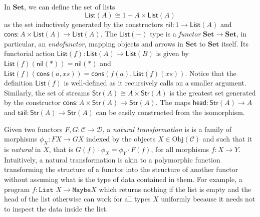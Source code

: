 \documentclass[a4paper,UKenglish,cleveref, autoref, thm-restate]{lipics-v2021}
\newcommand{\operator}[1]{\textsf{#1}}
\newcommand{\head}{\operator{head}}
\newcommand{\tail}{\operator{tail}}
\newcommand{\CatC}{\mathcal{C}}
\newcommand{\CatD}{\mathcal{D}}
\newcommand{\Set}{\mathbf{Set}}
\newcommand{\iso}{\cong}
\newcommand{\Obj}{\text{Obj}}
\newcommand{\Str}[1]{\operator{Str}(#1)}
\newcommand{\List}[1]{\operator{List}(#1)}
\newcommand{\nil}{\operator{nil}}
\newcommand{\cons}{\operator{cons}}
\begin{document}
In $\Set$, we can define the set of lists
\[
  \List{A} \iso 1 + A \times \List{A}
\]
as the set inductively generated by the constructors $\nil : 1 \to \List{A}$ and
$\cons : A \times \List{A} \to \List{A}$. The $\List{-}$ type is a
\emph{functor} $\Set \to \Set$, in particular, an \emph{endofunctor}, mapping
objects and arrows in $\Set$ to $\Set$ itself.
Its functorial action $\List{f} : \List{A} \to \List{B}$ is given by
$\List{f}(\nil(*)) = \nil(*)$ and
$\List{f}(\cons(a,xs)) = \cons(f(a), \List{f}(xs))$. Notice that the definition
$\List{f}$ is well-defined as it recursively calls on a smaller argument.
Similarly, the set of streams $\Str{A} \iso A \times \Str{A}$ is the greatest
set generated by the constructor $\cons : A \times \Str{A} \to \Str{A}$. The
maps $\head : \Str{A} \to A$ and $\tail : \Str{A} \to \Str{A}$ can be easily
constructed from the isomorphism.

Given two functors $F, G : \CatC \to \CatD$, a \emph{natural transformation} is
is a family of morphisms $\phi_{X} : FX \to GX$ indexed
by the objects $X \in \Obj(\CatC)$ and such that it is \emph{natural} in $X$,
that is $ G(f) \cdot \phi_{X} = \phi_{Y} \cdot F(f)$, for all morphisms
$f : X \to Y$. Intuitively, a natural transformation is akin to a polymorphic
function transforming the structure of a functor into the structure of another
functor without assuming what is the type of data contained in them.  For
example, a program $f : \texttt{List }X \to \texttt{Maybe} X$ which returns
nothing if the list is empty and the head of the list otherwise can work for all
types $X$ uniformly because it needs not to inspect the data inside the list.
\end{document}
